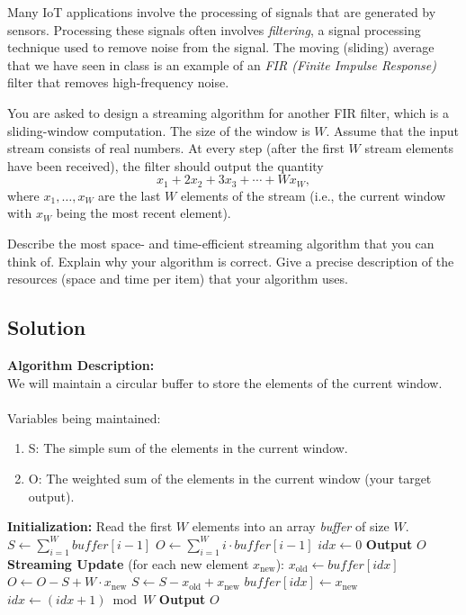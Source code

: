 \documentclass[11pt]{article}
\begin{document}
Many IoT applications involve the processing of signals that are generated by sensors. Processing these signals often involves \emph{filtering}, a signal processing technique used to remove noise from the signal. The moving (sliding) average that we have seen in class is an example of an \emph{FIR (Finite Impulse Response)} filter that removes high-frequency noise.

You are asked to design a streaming algorithm for another FIR filter, which is a sliding-window computation. The size of the window is $W$. Assume that the input stream consists of real numbers. At every step (after the first $W$ stream elements have been received), the filter should output the quantity
\[
  x_1 + 2 x_2 + 3 x_3 + \cdots + W x_W,
\]
where $x_1, \ldots, x_W$ are the last $W$ elements of the stream (i.e., the current window with $x_W$ being the most recent element).

Describe the most space- and time-efficient streaming algorithm that you can think of. Explain why your algorithm is correct. Give a precise description of the resources (space and time per item) that your algorithm uses.

\subsection*{Solution}

\textbf{Algorithm Description:}\\
We will maintain a circular buffer to store the elements of the current window.\\ \\
Variables being maintained:
\begin{enumerate}
    \item S: The simple sum of the elements in the current window.
    \item O: The weighted sum of the elements in the current window (your target output).
\end{enumerate}

\begin{algorithm}[H]
\caption{Streaming FIR Filter ($W$-size window)}
\begin{algorithmic}[1]
\State \textbf{Initialization:}
\State Read the first $W$ elements into an array \textit{buffer} of size $W$.
\State $S \gets \sum_{i=1}^{W} \textit{buffer}[i-1]$
\State $O \gets \sum_{i=1}^{W} i \cdot \textit{buffer}[i-1]$
\State $\textit{idx} \gets 0$ 
\State \textbf{Output} $O$
\State \textbf{Streaming Update} (for each new element $x_{\text{new}}$):
\State $x_{\text{old}} \gets \textit{buffer}[\textit{idx}]$
\State $O \gets O - S + W \cdot x_{\text{new}}$
\State $S \gets S - x_{\text{old}} + x_{\text{new}}$
\State $\textit{buffer}[\textit{idx}] \gets x_{\text{new}}$ 
\State $\textit{idx} \gets (\textit{idx} + 1) \bmod W$ 
\State \textbf{Output} $O$
\end{algorithmic}
\end{algorithm}
\end{document}
